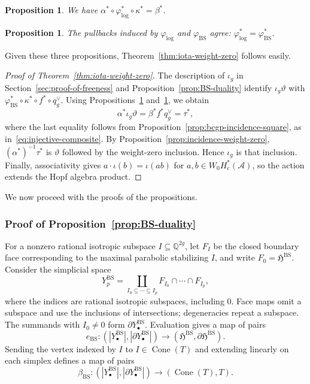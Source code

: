 \documentclass[12 pt]{amsart}
\newcommand{\fH}{\mathfrak H}
\newcommand{\QQ}{\mathbb{Q}}
\newcommand{\cA}{\mathcal{A}}
\newcommand{\BS}{\mathrm{BS}}
\newcommand{\Cone}{\operatorname{Cone}}
\newcommand{\<}{\langle}
\renewcommand{\>}{\rangle}
\newtheorem{proposition}[theorem]{Proposition}
\theoremstyle{definition}
\begin{document}
\begin{proposition}\label{prop:log-tropical-pullback}
We have $\alpha^* \circ \varphi_{\log}^* \circ \kappa^* = \beta^*$.
\end{proposition}

\begin{proposition}\label{prop:equal-boundary-pullbacks}
The pullbacks induced by $\varphi_{\log}$ and $\varphi_{\BS}$ agree: $\varphi_{\log}^* = \varphi_{\BS}^*$.
\end{proposition}

Given these three propositions, Theorem~\ref{thm:iota-weight-zero} follows easily. 

\begin{proof}[Proof of Theorem~\ref{thm:iota-weight-zero}]
The description of $\iota_g$ in Section~\ref{sec:proof-of-freeness} and Proposition~\ref{prop:BS-duality} identify $\iota_g \vartheta$ with $\varphi_{\BS}^* \circ \kappa^* \circ f^* \circ q_g^\vee$. Using Propositions~\ref{prop:equal-boundary-pullbacks} and~\ref{prop:log-tropical-pullback}, we obtain
\[
\alpha^* \iota_g \vartheta = \beta^* f^* q_g^\vee = \tau^*,
\]
where the last equality follows from Proposition~\ref{prop:bcgp-incidence-square}, as in~\eqref{eq:injective-composite}. By Proposition~\ref{prop:incidence-weight-zero}, $(\alpha^*)^{-1} \tau^*$ is $\vartheta$ followed by the weight-zero inclusion. Hence $\iota_g$ is that inclusion. Finally, associativity gives $a \cdot \iota(b) = \iota(ab)$ for $a, b \in W_0 H_c^*(\cA)$, so the action extends the Hopf algebra product.
\end{proof}

We now proceed with the proofs of the propositions.

\subsubsection{Proof of Proposition~\ref{prop:BS-duality}}\label{sec:BS-duality}
For a nonzero rational isotropic subspace $I \subseteq \QQ^{2g}$, let $F_I$ be the closed boundary face corresponding to the maximal parabolic stabilizing $I$, and write $F_0 = \fH^{\BS}$. Consider the simplicial space
\[
Y_p^{\BS} = \coprod_{I_0 \subseteq \cdots \subseteq I_p} F_{I_0} \cap \cdots \cap F_{I_p},
\]
where the indices are rational isotropic subspaces, including $0$. Face maps omit a subspace and use the inclusions of intersections; degeneracies repeat a subspace. The summands with $I_0 \ne 0$ form $\partial Y_\bullet^{\BS}$. Evaluation gives a map of pairs
\[
e_{\BS} \colon (|Y_\bullet^{\BS}|, |\partial Y_\bullet^{\BS}|) \longrightarrow (\fH^{\BS}, \partial \fH^{\BS}).
\]
Sending the vertex indexed by $I$ to $I \in \Cone(T)$ and extending linearly on each simplex defines a map of pairs
\[
\beta_{\BS} \colon (|Y_\bullet^{\BS}|, |\partial Y_\bullet^{\BS}|) \longrightarrow (\Cone(T), T).
\]
\end{document}
